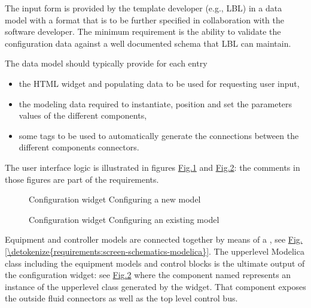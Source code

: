 \documentclass[letterpaper,10pt, openany,english]{sphinxmanual}
\begin{document}
The input form is provided by the template developer (e.g., LBL) in a data model with a format that is to be further specified in collaboration with the software developer. The minimum requirement is the ability to validate the configuration data against a well documented schema that LBL can maintain.

The data model should typically provide for each entry
\begin{itemize}
\item {} 
the HTML widget and populating data to be used for requesting user input,

\item {} 
the modeling data required to instantiate, position and set the parameters values of the different components,

\item {} 
some tags to be used to automatically generate the connections between the different components connectors.

\end{itemize}

The user interface logic is illustrated in figures \hyperref[\detokenize{requirements:screen-conf-0}]{Fig.\@ \ref{\detokenize{requirements:screen-conf-0}}} and \hyperref[\detokenize{requirements:screen-conf-1}]{Fig.\@ \ref{\detokenize{requirements:screen-conf-1}}}: the comments in those figures are part of the requirements.

\begin{figure}[htbp]
\centering
\capstart

\noindent{}
\caption{Configuration widget \textendash{} Configuring a new model}\label{\detokenize{requirements:screen-conf-0}}\end{figure}

\begin{figure}[htbp]
\centering
\capstart

\noindent{}
\caption{Configuration widget \textendash{} Configuring an existing model}\label{\detokenize{requirements:screen-conf-1}}\end{figure}

Equipment and controller models are connected together by means of a , see \hyperref[\detokenize{requirements:screen-schematics-modelica}]{Fig.\@ \ref{\detokenize{requirements:screen-schematics-modelica}}}. The upper\sphinxhyphen{}level Modelica class including the equipment models and control blocks is the ultimate output of the configuration widget: see \hyperref[\detokenize{requirements:screen-conf-1}]{Fig.\@ \ref{\detokenize{requirements:screen-conf-1}}} where the component named  represents an instance of the upper\sphinxhyphen{}level class  generated by the widget. That component exposes the outside fluid connectors as well as the top level control bus.
\end{document}
